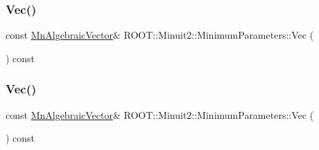 \subsubsection{\texorpdfstring{Vec()}{Vec()}\hspace{0.1cm}{\footnotesize\ttfamily [1/3]}}
{\footnotesize\ttfamily const \mbox{\hyperlink{namespaceROOT_1_1Minuit2_a62ed97730a1ca8d3fbaec64a19aa11c9}{Mn\+Algebraic\+Vector}}\& R\+O\+O\+T\+::\+Minuit2\+::\+Minimum\+Parameters\+::\+Vec (\begin{DoxyParamCaption}{ }\end{DoxyParamCaption}) const\hspace{0.3cm}{\ttfamily [inline]}}

\mbox{\label{classROOT_1_1Minuit2_1_1MinimumParameters_ad93c17d14f4ddbc66c91107ff3a80dbe}} 
\subsubsection{\texorpdfstring{Vec()}{Vec()}\hspace{0.1cm}{\footnotesize\ttfamily [2/3]}}
{\footnotesize\ttfamily const \mbox{\hyperlink{namespaceROOT_1_1Minuit2_a62ed97730a1ca8d3fbaec64a19aa11c9}{Mn\+Algebraic\+Vector}}\& R\+O\+O\+T\+::\+Minuit2\+::\+Minimum\+Parameters\+::\+Vec (\begin{DoxyParamCaption}{ }\end{DoxyParamCaption}) const\hspace{0.3cm}{\ttfamily [inline]}}

